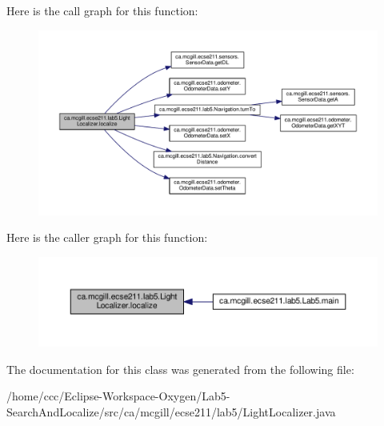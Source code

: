 Here is the call graph for this function\+:
\nopagebreak
\begin{figure}[H]
\begin{center}
\leavevmode
\includegraphics[width=350pt]{classca_1_1mcgill_1_1ecse211_1_1lab5_1_1_light_localizer_a441f56a899fae5bc9c1d6a6d25fbe0bb_cgraph}
\end{center}
\end{figure}
Here is the caller graph for this function\+:
\nopagebreak
\begin{figure}[H]
\begin{center}
\leavevmode
\includegraphics[width=350pt]{classca_1_1mcgill_1_1ecse211_1_1lab5_1_1_light_localizer_a441f56a899fae5bc9c1d6a6d25fbe0bb_icgraph}
\end{center}
\end{figure}


The documentation for this class was generated from the following file\+:\begin{DoxyCompactItemize}
\item 
/home/ccc/\+Eclipse-\/\+Workspace-\/\+Oxygen/\+Lab5-\/\+Search\+And\+Localize/src/ca/mcgill/ecse211/lab5/Light\+Localizer.\+java\end{DoxyCompactItemize}
